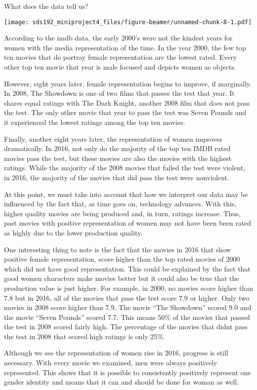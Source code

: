 \documentclass[ignorenonframetext,]{beamer}
\begin{document}
\begin{frame}{What does the data tell us?}

\texttt{[image: sds192\_miniproject4\_files/figure-beamer/unnamed-chunk-8-1.pdf]}

According to the imdb data, the early 2000's were not the kindest years
for women with the media representation of the time. In the year 2000,
the few top ten movies that do portray female representation are the
lowest rated. Every other top ten movie that year is male focused and
depicts women as objects.

However, eight years later, female representation begins to improve, if
marginally. In 2008, The Showdown is one of two films that passes the
test that year. It shares equal ratings with The Dark Knight, another
2008 film that does not pass the test. The only other movie that year to
pass the test was Seven Pounds and it experienced the lowest ratings
among the top ten movies.

Finally, another eight years later, the representation of women improves
dramatically. In 2016, not only do the majority of the top ten IMDB
rated movies pass the test, but these movies are also the movies with
the highest ratings. While the majority of the 2008 movies that failed
the test were violent, in 2016, the majority of the movies that did pass
the test were nonviolent.

At this point, we must take into account that how we interpret our data
may be influenced by the fact that, as time goes on, technology
advances. With this, higher quality movies are being produced and, in
turn, ratings increase. Thus, past movies with positive representation
of women may not have been been rated as highly due to the lower
production quality.

One interesting thing to note is the fact that the movies in 2016 that
show positive female representation, score higher than the top rated
movies of 2000 which did not have good representation. This could be
explained by the fact that good women characters make movies better but
it could also be true that the production value is just higher. For
example, in 2000, no movies score higher than 7.8 but in 2016, all of
the movies that pass the test score 7.9 or higher. Only two movies in
2008 score higher than 7.9. The movie ``The Showdown'' scored 9.0 and
the movie ``Seven Pounds'' scored 7.7. This means 50\% of the movies
that passed the test in 2008 scored fairly high. The percentage of the
movies that didnt pass the test in 2008 that scored high ratings is only
25\%.

Although we see the representation of women rise in 2016, progress is
still necessary. With every movie we examined, men were always
positively represented. This shows that it is possible to consistently
positively represent one gender identity and means that it can and
should be done for woman as well.

\end{frame}
\end{document}
